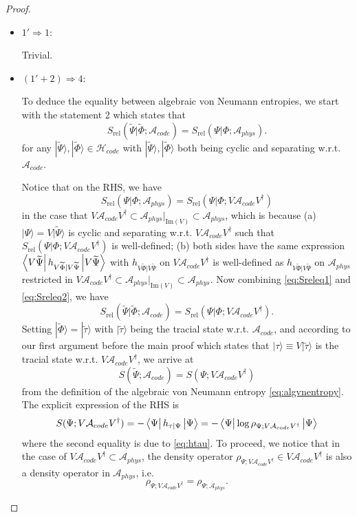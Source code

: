 \documentclass[a4paper,11pt]{article}
\newcommand{\ket}[1]{| #1 \rangle } %
\newcommand{\diracprod}[3]{\left\langle  #1 \vphantom{#2#3} \right|#2 \left| #3 \vphantom{#1#2} \right\rangle } %
\renewcommand{\=}[1]{\stackrel{#1}{=}} %
\newcommand{\im}{\text{Im}}
\def\A{\mathcal{A}}
\def\H{\mathcal{H}}
\def\Srel{S_{\text{rel}}}
\begin{document}
\begin{proof}
\begin{itemize}
		\item $1'\Rightarrow 1$:
		
		Trivial.
		
		\item $(1'+ 2)\Rightarrow4$:
		
		To deduce the equality between algebraic von Neumann entropies, we start with the statement 2 which states that 
		\begin{equation}\label{eq:Sreleq1}
			\Srel(\widetilde{\Psi}|\widetilde{\Phi};\A_{code})=\Srel(\Psi|\Phi;\A_{phys}).
		\end{equation}
		for any $\ket{\widetilde{\Psi}},\ket{\widetilde{\Phi}}\in\H_{code}$ with $\ket{\widetilde{\Psi}},\ket{\widetilde{\Phi}}$ both being cyclic and separating w.r.t. $\A_{code}$.
		
		Notice that on the RHS, we have
		\begin{equation}\label{eq:Sreleq2}
			\Srel(\Psi|\Phi;\A_{phys})=\Srel(\Psi|\Phi;V\A_{code} V^\dagger)
		\end{equation}
		in the case that $V\A_{code} V^\dagger \subset \A_{phys}|_{\im(V)}\subset\A_{phys}$, which is because (a) $\ket{\Psi}=V\ket{\widetilde{\Psi}}$ is cyclic and separating w.r.t. $V\A_{code}V^\dagger$ such that $\Srel(\Psi|\Phi;V\A_{code} V^\dagger)$ is well-defined; (b) both sides have the same expression $\diracprod{V\widetilde{\Psi}}{h_{V\widetilde{\Phi}|V\widetilde{\Psi}}}{V\widetilde{\Psi}}$ with $h_{V\widetilde{\Phi}|V\widetilde{\Psi}}$ on $V\A_{code} V^\dagger$ is well-defined as $h_{V\widetilde{\Phi}|V\widetilde{\Psi}}$ on $\A_{phys}$ restricted in $V\A_{code} V^\dagger \subset \A_{phys}|_{\im(V)}\subset\A_{phys}$. Now combining \eqref{eq:Sreleq1} and \eqref{eq:Sreleq2}, we have
		\begin{equation}
			\Srel(\widetilde{\Psi}|\widetilde{\Phi};\A_{code})=\Srel(\Psi|\Phi;V\A_{code} V^\dagger).
		\end{equation}
		Setting $\ket{\widetilde{\Phi}}=\ket{\widetilde{\tau}}$ with $\ket{\widetilde{\tau}}$ being the tracial state w.r.t. $\A_{code}$, and according to our first argument before the main proof which states that $\ket{\tau}\equiv V\ket{\tilde{\tau}}$ is the tracial state w.r.t. $V\A_{code} V^\dagger$, we arrive at
		\begin{equation}\label{eq:Sreleq3}
			S(\widetilde{\Psi};\A_{code})=S(\Psi;V\A_{code} V^\dagger)
		\end{equation}
		from the definition of the algebraic von Neumann entropy \eqref{eq:algvnentropy}. The explicit expression of the RHS is
		\begin{equation}
			S(\Psi;V\A_{code} V^\dagger)=-\diracprod{\Psi}{h_{\tau|\Psi}}{\Psi}=-\diracprod{\Psi}{\log \rho_{\Psi;V\A_{code} V^\dagger}}{\Psi}
		\end{equation} 
		where the second equality is due to \eqref{eq:htau}. To proceed, we notice that in the case of $V\A_{code} V^\dagger \subset\A_{phys}$, the density operator $\rho_{\Psi;V\A_{code} V^\dagger}\in V\A_{code} V^\dagger$ is also a density operator in $\A_{phys}$, i.e.
		\begin{equation}
			\rho_{\Psi;V\A_{code} V^\dagger}=\rho_{\Psi;\A_{phys}}.
		\end{equation}
		

\end{itemize}
\end{proof}
\end{document}

